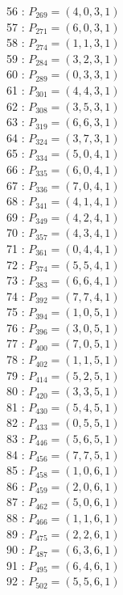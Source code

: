 \documentclass{article}
\begin{document}
{\begin{multicols}{3}
56 : $P_{269}=( 4, 0, 3, 1 )$\\
57 : $P_{271}=( 6, 0, 3, 1 )$\\
58 : $P_{274}=( 1, 1, 3, 1 )$\\
59 : $P_{284}=( 3, 2, 3, 1 )$\\
60 : $P_{289}=( 0, 3, 3, 1 )$\\
61 : $P_{301}=( 4, 4, 3, 1 )$\\
62 : $P_{308}=( 3, 5, 3, 1 )$\\
63 : $P_{319}=( 6, 6, 3, 1 )$\\
64 : $P_{324}=( 3, 7, 3, 1 )$\\
65 : $P_{334}=( 5, 0, 4, 1 )$\\
66 : $P_{335}=( 6, 0, 4, 1 )$\\
67 : $P_{336}=( 7, 0, 4, 1 )$\\
68 : $P_{341}=( 4, 1, 4, 1 )$\\
69 : $P_{349}=( 4, 2, 4, 1 )$\\
70 : $P_{357}=( 4, 3, 4, 1 )$\\
71 : $P_{361}=( 0, 4, 4, 1 )$\\
72 : $P_{374}=( 5, 5, 4, 1 )$\\
73 : $P_{383}=( 6, 6, 4, 1 )$\\
74 : $P_{392}=( 7, 7, 4, 1 )$\\
75 : $P_{394}=( 1, 0, 5, 1 )$\\
76 : $P_{396}=( 3, 0, 5, 1 )$\\
77 : $P_{400}=( 7, 0, 5, 1 )$\\
78 : $P_{402}=( 1, 1, 5, 1 )$\\
79 : $P_{414}=( 5, 2, 5, 1 )$\\
80 : $P_{420}=( 3, 3, 5, 1 )$\\
81 : $P_{430}=( 5, 4, 5, 1 )$\\
82 : $P_{433}=( 0, 5, 5, 1 )$\\
83 : $P_{446}=( 5, 6, 5, 1 )$\\
84 : $P_{456}=( 7, 7, 5, 1 )$\\
85 : $P_{458}=( 1, 0, 6, 1 )$\\
86 : $P_{459}=( 2, 0, 6, 1 )$\\
87 : $P_{462}=( 5, 0, 6, 1 )$\\
88 : $P_{466}=( 1, 1, 6, 1 )$\\
89 : $P_{475}=( 2, 2, 6, 1 )$\\
90 : $P_{487}=( 6, 3, 6, 1 )$\\
91 : $P_{495}=( 6, 4, 6, 1 )$\\
92 : $P_{502}=( 5, 5, 6, 1 )$\\

\end{multicols}}
\end{document}
